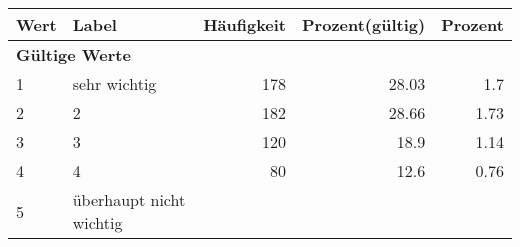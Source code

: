      \begin{longtable}{lXrrr}
     \toprule
     \textbf{Wert} & \textbf{Label} & \textbf{Häufigkeit} & \textbf{Prozent(gültig)} & \textbf{Prozent} \\
     \endhead
     \midrule
     \multicolumn{5}{l}{\textbf{Gültige Werte}}\\

     1 &
     \multicolumn{1}{X}{ sehr wichtig   } &


       \num{178} &
       \num[round-mode=places,round-precision=2]{28.03} &
         \num[round-mode=places,round-precision=2]{1.7} \\

     2 &
     \multicolumn{1}{X}{ 2   } &


       \num{182} &
       \num[round-mode=places,round-precision=2]{28.66} &
         \num[round-mode=places,round-precision=2]{1.73} \\

     3 &
     \multicolumn{1}{X}{ 3   } &


       \num{120} &
       \num[round-mode=places,round-precision=2]{18.9} &
         \num[round-mode=places,round-precision=2]{1.14} \\

     4 &
     \multicolumn{1}{X}{ 4   } &


       \num{80} &
       \num[round-mode=places,round-precision=2]{12.6} &
         \num[round-mode=places,round-precision=2]{0.76} \\

     5 &
     \multicolumn{1}{X}{ überhaupt nicht wichtig   } &



\end{longtable}
